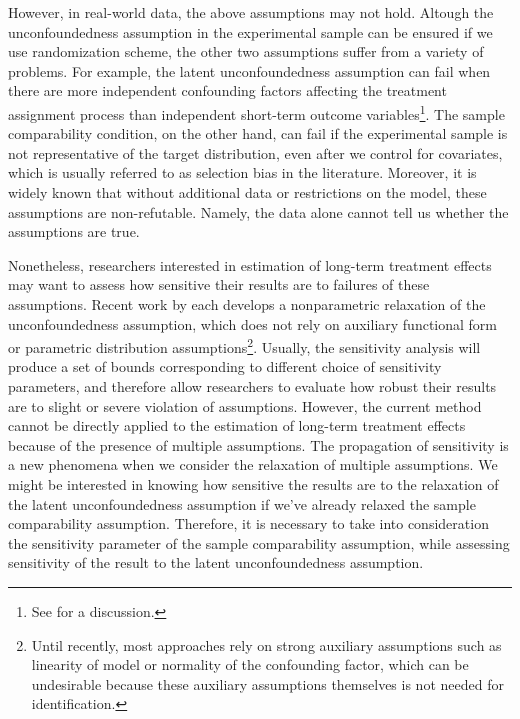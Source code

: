 \documentclass[12pt]{article}
\begin{document}
	However, in real-world data, the above assumptions may not hold. Altough the unconfoundedness assumption in the experimental sample can be ensured if we use randomization scheme, the other two assumptions suffer from a variety of problems. For example, the latent unconfoundedness assumption can fail when there are more independent confounding factors affecting the treatment assignment process than independent short-term outcome variables\footnote{See \textcite{athey2020combining} for a discussion.}. The sample comparability condition, on the other hand, can fail if the experimental sample is not representative of the target distribution, even after we control for covariates, which is usually referred to as selection bias in the literature. Moreover, it is widely known that without additional data or restrictions on the model, these assumptions are non-refutable. Namely, the data alone cannot tell us whether the assumptions are true. 
	
	Nonetheless, researchers interested in estimation of long-term treatment effects may want to assess how sensitive their results are to failures of these assumptions. Recent work by \textcite{masten2018identification, yadlowsky2018bounds, kallus2018confounding} each develops a nonparametric relaxation of the unconfoundedness assumption, which does not rely on auxiliary functional form or parametric distribution assumptions\footnote{Until recently, most approaches rely on strong auxiliary assumptions such as linearity of model or normality of the confounding factor, which can be undesirable because these auxiliary assumptions themselves is not needed for identification. }. Usually, the sensitivity analysis will produce a set of bounds corresponding to different choice of sensitivity parameters, and therefore allow researchers to evaluate how robust their results are to slight or severe violation of assumptions. However, the current method cannot be directly applied to the estimation of long-term treatment effects because of the presence of multiple assumptions. The propagation of sensitivity is a new phenomena when we consider the relaxation of multiple assumptions. We might be interested in knowing how sensitive the results are to the relaxation of the latent unconfoundedness assumption if we've already relaxed the sample comparability assumption. Therefore, it is necessary to take into consideration the sensitivity parameter of the sample comparability assumption, while assessing sensitivity of the result to the latent unconfoundedness assumption. 
    
\end{document}
